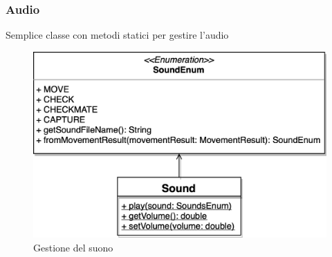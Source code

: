 \documentclass[a4paper,12pt]{report}
\begin{document}
\subsubsection*{Audio}
Semplice classe con metodi statici per gestire l'audio
\begin{figure}[H]
    \begin{center}
        \centering
        \includegraphics[scale=0.75]{img/Tommaso/sound.png}
    \end{center}
    \caption{Gestione del suono}
    \label{img:sound}
\end{figure}
\paragraph{}
\end{document}
